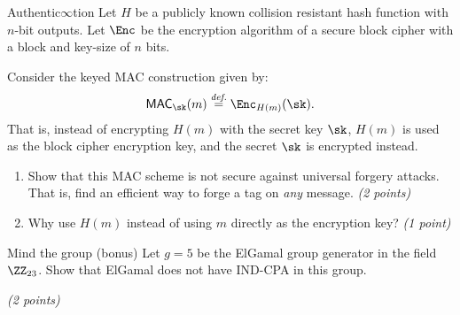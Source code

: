 \documentclass{homework}
\newcommand*{\MAC}{\mathsf{MAC}}
\begin{document}
\begin{task}{Authentic$\infty$tion}
  Let $H$ be a publicly known collision resistant hash function with $n$-bit outputs.
  Let $\Enc$ be the encryption algorithm of a secure block cipher with a block and key-size of $n$ bits.

  Consider the keyed MAC construction given by:
  \[
    \MAC_{\sk}(m) \overset{\textit{def.}}{=} \Enc_{H(m)}(\sk).
  \]
  That is, instead of encrypting $H(m)$ with the secret key $\sk$, $H(m)$ is used as the block cipher encryption key, and the secret $\sk$ is encrypted instead.

  \begin{enumerate}
    \item Show that this MAC scheme is not secure against universal forgery attacks.
    That is, find an efficient way to forge a tag on \emph{any} message.
    \textit{(2 points)}

    \item Why use $H(m)$ instead of using $m$ directly as the encryption key?
    \textit{(1 point)}
  \end{enumerate}
\end{task}

\begin{task}{Mind the group (bonus)}
  Let $g = 5$ be the ElGamal group generator in the field $\ZZ_{23}$.
  Show that ElGamal does not have IND-CPA in this group.

  \textit{(2 points)}
\end{task}
\end{document}
